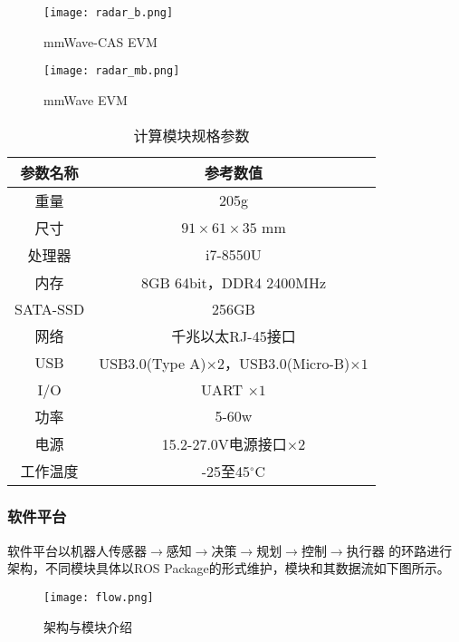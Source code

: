 \documentclass[lang=cn,11pt,a4paper]{elegantpaper}
\begin{document}
\begin{figure}
  \centering
  \texttt{[image: radar\_b.png]}
  \caption{mmWave-CAS EVM}\label{fig:CAS}
\end{figure}

\begin{figure}
  \centering
  \texttt{[image: radar\_mb.png]}
  \caption{mmWave EVM}\label{fig:mini}
\end{figure}
  

\begin{table}[!htbp]
  \centering
  \caption{计算模块规格参数}\label{tab:manifold}
  \begin{tabular}{cc}
    \toprule
    参数名称  & 参考数值  \\
    \midrule
    重量  & 205g   \\
    尺寸 & $91 \times 61 \times 35$ mm  \\
    处理器 &  i7-8550U \\
    内存 & 8GB 64bit，DDR4 2400MHz \\
    SATA-SSD & 256GB\\
    网络 & 千兆以太RJ-45接口\\
    USB & USB3.0(Type A)$\times 2$，USB3.0(Micro-B)$\times 1$ \\
    I/O & UART $\times 1$  \\
    功率 & 5-60w \\
    电源 & 15.2-27.0V电源接口$\times 2$  \\
    工作温度 & -25至45$^{\circ}$C\\
  \bottomrule
  \end{tabular}%
\end{table}%

\subsubsection{软件平台}

软件平台以机器人传感器$\rightarrow$感知$\rightarrow$决策$\rightarrow$规划$\rightarrow$控制$\rightarrow$执行器 的环路进行架构，不同模块具体以ROS Package的形式维护，模块和其数据流如下图所示。
\begin{figure}
  \centering
  \texttt{[image: flow.png]}
  \caption{架构与模块介绍}\label{fig:flow}
\end{figure}
\end{document}
